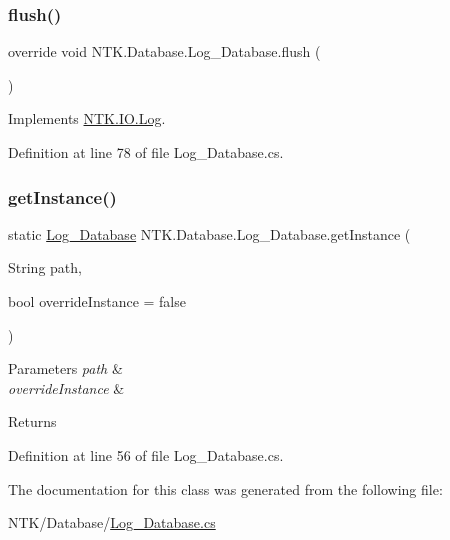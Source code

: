\subsubsection{\texorpdfstring{flush()}{flush()}}
{\footnotesize\ttfamily override void N\+T\+K.\+Database.\+Log\+\_\+\+Database.\+flush (\begin{DoxyParamCaption}{ }\end{DoxyParamCaption})\hspace{0.3cm}{\ttfamily [virtual]}}







Implements \mbox{\hyperlink{class_n_t_k_1_1_i_o_1_1_log_ac59e6a398332c79ad801e79f20ffed10}{N\+T\+K.\+I\+O.\+Log}}.



Definition at line 78 of file Log\+\_\+\+Database.\+cs.

\mbox{\label{class_n_t_k_1_1_database_1_1_log___database_af19bbcf4304e70748c3dc89555755542}} 
\subsubsection{\texorpdfstring{getInstance()}{getInstance()}}
{\footnotesize\ttfamily static \mbox{\hyperlink{class_n_t_k_1_1_database_1_1_log___database}{Log\+\_\+\+Database}} N\+T\+K.\+Database.\+Log\+\_\+\+Database.\+get\+Instance (\begin{DoxyParamCaption}\item[{String}]{path,  }\item[{bool}]{override\+Instance = {\ttfamily false} }\end{DoxyParamCaption})\hspace{0.3cm}{\ttfamily [static]}}






\begin{DoxyParams}{Parameters}
{\em path} & \\
\hline
{\em override\+Instance} & \\
\hline
\end{DoxyParams}
\begin{DoxyReturn}{Returns}

\end{DoxyReturn}


Definition at line 56 of file Log\+\_\+\+Database.\+cs.



The documentation for this class was generated from the following file\+:\begin{DoxyCompactItemize}
\item 
N\+T\+K/\+Database/\mbox{\hyperlink{_log___database_8cs}{Log\+\_\+\+Database.\+cs}}\end{DoxyCompactItemize}
